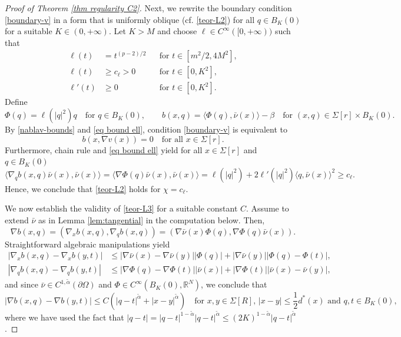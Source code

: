 \documentclass[10pt,a4paper, reqno]{amsart}
\numberwithin{equation}{section}
\newcommand{\R}{\mathbb{R}}
\begin{document}
\begin{proof}[Proof of Theorem \ref{thm regularity C2}]
Next, we rewrite the boundary condition \eqref{boundary-v} in a form that is uniformly oblique (cf. \eqref{teor-L2}) for all $q \in B_K(0)$ for a suitable $K \in (0,+\infty)$. Let $K>M$ and choose $\ell\in C^\infty([0,+\infty))$ such that
\begin{equation}\label{eq bound ell}
\begin{aligned}
    \ell(t)&=t^{(p-2)/2} &&\text{for }t\in[m^2/2,4M^2],\\
    \ell(t)&\ge c_\ell>0 &&\text{for }t\in[0,K^2],\\
    \ell'(t)&\ge0 &&\text{for }t\in[0,K^2].  
\end{aligned}    
\end{equation}
Define
\[
    \Phi(q)=\ell(|q|^2)q \quad \text{for } q \in B_K(0),\qquad b(x,q)=\langle \Phi(q),\bar{\nu}(x)\rangle-\beta \quad \text{for } (x,q) \in \Sigma[r] \times B_K(0).
\]
By \eqref{nablav-bounds} and \eqref{eq bound ell}, condition \eqref{boundary-v} is equivalent to
\begin{equation}\label{boundary-cond}
    b(x,\nabla v(x))=0 \quad\text{for all } x \in \Sigma[r].
\end{equation}
Furthermore, chain rule and \eqref{eq bound ell} yield for all $x \in \Sigma[r]$ and $q \in B_K(0)$
\[
    \langle \nabla_q b(x,q) \bar{\nu}(x), \bar{\nu}(x) \rangle
    =\langle \nabla \Phi(q)\bar{\nu}(x),\bar{\nu}(x)\rangle 
    =\ell(|q|^2)+2\ell'(|q|^2)\langle q,\bar{\nu}(x)\rangle^2
    \ge c_\ell.
\]
Hence, we conclude that \eqref{teor-L2} holds for $\chi = c_\ell$. 

We now establish the validity of \eqref{teor-L3} for a suitable constant $C$. Assume to extend $\bar{\nu}$ as in Lemma \ref{lem:tangential} in the computation below. Then,
\[
\nabla b(x,q) = \left(\nabla_x b(x,q) , \nabla_q b(x,q) \right) = \left( \nabla \bar{\nu} (x) \Phi(q) , \nabla \Phi(q) \bar{\nu}(x) \right).
\]
Straightforward algebraic manipulations yield
\begin{equation*}
\begin{split}
    |\nabla_x b(x,q) - \nabla_x b(y,t)| &\leq | \nabla \bar{\nu} (x) -  \nabla \bar{\nu} (y) | |\Phi(q)| + |\nabla \bar{\nu} (y) | |\Phi(q) - \Phi(t)|,
    \\
    |\nabla_q b(x,q) - \nabla_q b(y,t)| &\leq |\nabla \Phi(q) - \nabla \Phi(t)| |\bar{\nu}(x)| + |\nabla \Phi(t)| |\bar{\nu}(x) - \bar{\nu}(y)|,
\end{split}
\end{equation*}
and since $\bar{\nu} \in C^{1,\tilde{\alpha}}(\partial\Omega)$ and $\Phi\in C^\infty(B_K(0), \R^N)$, we conclude that 
\[
    |\nabla b(x,q)- \nabla b(y,t)| \le C\left(|q-t|^{\tilde{\alpha}} + |x-y|^{\tilde{\alpha}} \right) \quad \text{for } x,y \in \Sigma[R],\, |x-y| \le \frac{1}{2} d^\ast(x) \text{ and } q,t \in B_K(0),
\]
where we have used the fact that $|q-t| = |q-t|^{1-\tilde{\alpha}} |q-t|^{\tilde{\alpha}} \leq (2K)^{1-\tilde{\alpha}} |q-t|^{\tilde{\alpha}}$.


\end{proof}
\end{document}
